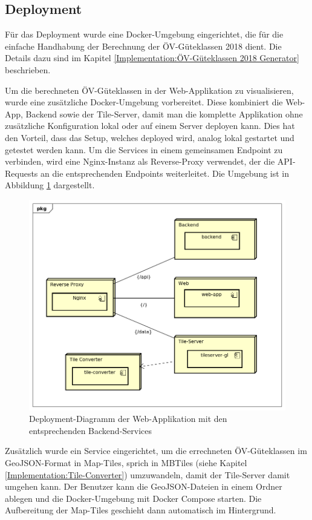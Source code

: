 \subsection{Deployment}
\label{Infrastruktur:Deployment}

Für das Deployment wurde eine Docker-Umgebung eingerichtet, die für die einfache Handhabung der Berechnung der \acs{ÖV}-Güteklassen 2018 dient.
Die Details dazu sind im Kapitel \ref{Implementation:ÖV-Güteklassen 2018 Generator} beschrieben.

Um die berechneten \acs{ÖV}-Güteklassen in der Web-Applikation zu visualisieren, wurde eine zusätzliche Docker-Umgebung vorbereitet.
Diese kombiniert die Web-App, Backend sowie der Tile-Server, damit man die komplette Applikation ohne zusätzliche Konfiguration lokal oder auf einem Server deployen kann.
Dies hat den Vorteil, dass das Setup, welches deployed wird, analog lokal gestartet und getestet werden kann.
Um die Services in einem gemeinsamen Endpoint zu verbinden, wird eine Nginx-Instanz als Reverse-Proxy verwendet, der die \acs{API}-Requests an die entsprechenden Endpoints weiterleitet.
Die Umgebung ist in Abbildung \ref{fig:deployment_web-app} dargestellt.

\begin{figure}[ht]
    \centering
    \includegraphics[width=0.8\linewidth]{projectdoc/img/deployment_web-app}
    \caption[Deployment-Diagramm der Web-Applikation]{Deployment-Diagramm der Web-Applikation mit den entsprechenden Backend-Services}
    \label{fig:deployment_web-app}
\end{figure}

Zusätzlich wurde ein Service eingerichtet, um die errechneten \acs{ÖV}-Güteklassen im GeoJSON-Format in Map-Tiles, sprich in MBTiles (siehe Kapitel \ref{Implementation:Tile-Converter}) umzuwandeln, damit der Tile-Server damit umgehen kann.
Der Benutzer kann die GeoJSON-Dateien in einem Ordner ablegen und die Docker-Umgebung mit Docker Compose starten.
Die Aufbereitung der Map-Tiles geschieht dann automatisch im Hintergrund.

